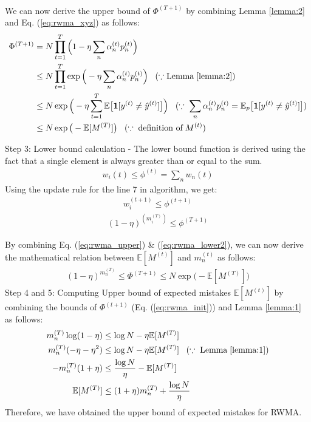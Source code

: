 \documentclass[11pt]{article}
\begin{document}
{\begin{align}
\end{align}
We can now derive the upper bound of $\Phi^{(T+1)}$ by combining Lemma \ref{lemma:2} and Eq. (\ref{eq:rwma_xyz}) as follows:
\begin{align}
    \Phi^{(T+1)}&=N\prod_{t=1}^{T}\Big(1-\eta\sum_n\alpha_n^{(t)}p_n^{(t)}\Big)\nonumber\\
    &\leq N\prod_{t=1}^T\exp{\Big(-\eta\sum_n\alpha_n^{(t)}p_n^{(t)}\Big)}\;\;\;(\because \text{Lemma}\;\ref{lemma:2})\nonumber\\
    &\leq N\exp{\Big(-\eta\sum_{t=1}^{T}\mathbb{E}\big[\textbf{1}[y^{(t)}\neq\hat{y}^{(t)}]\big]\Big)}\;\;\;(\because\;\sum_n\alpha_n^{(t)}p_n^{(t)}=\mathbb{E}_p\big[\textbf{1}[y^{(t)}\neq\hat{y}^{(t)}]\big])\nonumber\\
    &\leq N\exp{\big(-\mathbb{E}[M^{(T)}]\big)}\;\;\;(\because\;\text{definition of}\;M^{(t)})\label{eq:rwma_upper}
\end{align}

Step 3: Lower bound calculation - The lower bound function is derived using the fact that a single element is always greater than or equal to the sum.
\begin{align}
    w_i{(t)} \leq \phi^{(t)}=\sum_n w_n{(t)} 
\end{align}
Using the update rule for the line 7 in algorithm, we get:
\begin{align}
    w_i^{(t+1)} \leq \phi^{(t+1)}
\end{align}
\begin{align}
    (1-\eta)^{(m_i^{(T)})} \leq \phi^{(T+1)} \label{eq:rwma_lower2}
\end{align}


By combining Eq. (\ref{eq:rwma_upper}) \& (\ref{eq:rwma_lower2}), we can now derive the mathematical relation between $\mathbb{E}[M^{(t)}]$ and $m_n^{(t)}$ as follows:
\begin{align}
    (1-\eta)^{m_n^{(T)}}\leq \Phi^{(T+1)} \leq N\exp{\big(-\mathbb{E}[M^{(T)}]\big)}\label{eq:rwma_init}
\end{align}
Step 4 and 5: Computing Upper bound of expected mistakes $\mathbb{E}[M^{(t)}]$ by combining the bounds of $\Phi^{(t+1)}$ (Eq. (\ref{eq:rwma_init})) and Lemma \ref{lemma:1} as follows:
\begin{align*}
    m_n^{(T)}\log(1-\eta) &\leq \log N - \eta\mathbb{E}[M^{(T)}]\\
    m_n^{(T)}(-\eta-\eta^2)&\leq \log N - \eta\mathbb{E}[M^{(T)}] \;\;\;(\because\; \text{Lemma}\;\ref{lemma:1})\\
    -m_n^{(T)}(1+\eta)&\leq\frac{\log N}{\eta} - \mathbb{E}[M^{(T)}]\\
    \mathbb{E}[M^{(T)}]&\leq (1+\eta)m_n^{(T)} + \frac{\log N}{\eta}
\end{align*}
Therefore, we have obtained the upper bound of expected mistakes for RWMA.
}
\end{document}
